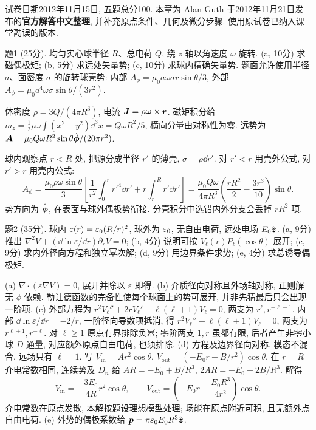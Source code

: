 试卷日期2012年11月15日, 五题总分100. 本章为 Alan Guth 于2012年11月21日发布的\textbf{官方解答中文整理}, 并补充原点条件、几何及微分步骤. 使用原试卷已纳入课堂勘误的版本.

\begin{exercise}
题1 (25分). 均匀实心球半径 $R$、总电荷 $Q$, 绕 $z$ 轴以角速度 $\omega$ 旋转. (a, 10分) 求磁偶极矩; (b, 5分) 求远处矢量势; (c, 10分) 求球内精确矢量势. 题面允许使用半径 $a$、面密度 $\sigma$ 的旋转球壳势: 内部 $A_\phi=\mu_0a\omega\sigma r\sin\theta/3$, 外部 $A_\phi=\mu_0a^4\omega\sigma\sin\theta/(3r^2)$.
\end{exercise}
\begin{solution}
体密度 $\rho=3Q/(4\pi R^3)$, 电流 $\boldsymbol{J}=\rho\boldsymbol{\omega}\times\boldsymbol{r}$. 磁矩积分给
$ m_z=\frac12\rho\omega\int(x^2+y^2)\dd^3x=Q\omega R^2/5$, 横向分量由对称性为零. 远势为 $\boldsymbol{A}=\mu_0Q\omega R^2\sin\theta\hat{\boldsymbol{\phi}}/(20\pi r^2)$.

球内观察点 $r<R$ 处, 把源分成半径 $r'$ 的薄壳, $\sigma=\rho\dd r'$. 对 $r'<r$ 用壳外公式, 对 $r'>r$ 用壳内公式:
\[
A_\phi=\frac{\mu_0\rho\omega\sin\theta}3
\left[\frac1{r^2}\int_0^r r'^4\dd r'+r\int_r^Rr'\dd r'\right]
=\frac{\mu_0Q\omega}{4\pi R^3}\left(\frac{rR^2}2-\frac{3r^3}{10}\right)\sin\theta.
\]
势方向为 $\hat{\boldsymbol{\phi}}$, 在表面与球外偶极势衔接. 分壳积分中选错内外分支会丢掉 $rR^2$ 项.
\end{solution}

\begin{exercise}
题2 (35分). 球内 $\varepsilon(r)=\varepsilon_0(R/r)^2$, 球外为 $\varepsilon_0$, 无自由电荷, 远处电场 $E_0\hat{\boldsymbol{z}}$. (a, 9分) 推出 $\nabla^2V+(\dd\ln\varepsilon/\dd r)\partial_rV=0$; (b, 4分) 说明可按 $V_\ell(r)P_\ell(\cos\theta)$ 展开; (c, 9分) 求内外径向方程和独立幂次解; (d, 9分) 用边界条件求势; (e, 4分) 求总诱导偶极矩.
\end{exercise}
\begin{solution}
(a) $\nabla\cdot(\varepsilon\nabla V)=0$, 展开并除以 $\varepsilon$ 即得. (b) 介质径向对称且外场轴对称, 正则解无 $\phi$ 依赖. 勒让德函数的完备性使每个球面上的势可展开, 并非先猜最后只会出现一阶项.
(c) 外部方程为 $r^2V_\ell''+2rV_\ell'-\ell(\ell+1)V_\ell=0$, 两支为 $r^\ell,r^{-\ell-1}$. 内部 $\dd\ln\varepsilon/\dd r=-2/r$, 一阶径向导数项抵消, 得 $r^2V_\ell''-\ell(\ell+1)V_\ell=0$, 两支为 $r^{\ell+1},r^{-\ell}$. 对 $\ell\ge1$ 原点有界排除负幂; 零阶两支 $1,r$ 虽都有限, 后者产生非零小球 $D$ 通量, 对应额外原点自由电荷, 也须排除.
(d) 方程及边界径向对称, 模态不混合, 远场只有 $\ell=1$. 写 $V_\mathrm{in}=Ar^2\cos\theta$, $V_\mathrm{out}=(-E_0r+B/r^2)\cos\theta$. 在 $r=R$ 介电常数相同, 连续势及 $D_n$ 给 $AR=-E_0+B/R^3$, $2AR=-E_0-2B/R^3$. 解得
\[
V_\mathrm{in}=-\frac{3E_0}{4R}r^2\cos\theta,\qquad
V_\mathrm{out}=\left(-E_0r+\frac{E_0R^3}{4r^2}\right)\cos\theta.
\]
介电常数在原点发散, 本解按题设理想模型处理; 场能在原点附近可积, 且无额外点自由电荷. (e) 外势的偶极系数给 $\boldsymbol{p}=\pi\varepsilon_0 E_0R^3\hat{\boldsymbol{z}}$.
\end{solution}

